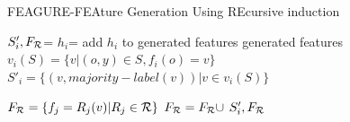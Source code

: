 \documentclass{article}
\theoremstyle{definition}
\begin{document}
\begin{algorithm}[H]
	\caption{FEAGURE-FEAture Generation Using REcursive induction}
	\label{code-creating-prob}
	\small
	\begin{algorithmic}
		\State $S'_i,F_{\cal R}$=  %
		\State $h_i$=  
		\State add $h_i$ to generated features
		\EndFor
		\State \Return generated features
		\EndFunction
		\State 
		\State $v_i(S) = \{v | (o,y) \in S, f_{i}(o)=v\}$
		\State $S'_i = \{ (v, majority-label(v)) | v \in v_i(S) \}$ 
		
		\State $F_{\cal R}=\{f_{j}=R_j(v)| R_j\in{\cal R}\}$
		\State $F_{\cal R}=F_{\cal R}\cup$
		\EndIf
		\State \Return $S'_i, F_{\cal R}$ 
		\EndFunction
		
	\end{algorithmic}
\end{algorithm}



\end{document}
